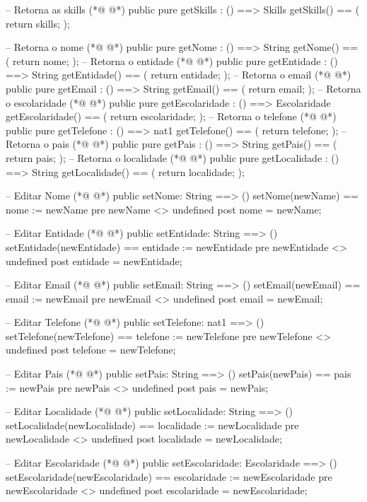 \begin{vdmpp}[breaklines=true]
 -- Retorna as skills
(*@
\label{getSkills:80}
@*)
 public pure getSkills : () ==> Skills
 getSkills() ==
 (
  return skills;
 );
 
 -- Retorna o nome
(*@
\label{getNome:87}
@*)
 public pure getNome : () ==> String
 getNome() ==
 (
  return nome;
 );
 -- Retorna o entidade
(*@
\label{getEntidade:93}
@*)
 public pure getEntidade : () ==> String
 getEntidade() ==
 (
  return entidade;
 );
 -- Retorna o email
(*@
\label{getEmail:99}
@*)
 public pure getEmail : () ==> String
 getEmail() ==
 (
  return email;
 );
 -- Retorna o escolaridade
(*@
\label{getEscolaridade:105}
@*)
 public pure getEscolaridade : () ==> Escolaridade
 getEscolaridade() ==
 (
  return escolaridade;
 );
 -- Retorna o telefone
(*@
\label{getTelefone:111}
@*)
 public pure getTelefone : () ==> nat1
 getTelefone() ==
 (
  return telefone;
 );
 -- Retorna o pais
(*@
\label{getPais:117}
@*)
 public pure getPais : () ==> String
 getPais() ==
 (
  return pais;
 );
 -- Retorna o localidade
(*@
\label{getLocalidade:123}
@*)
 public pure getLocalidade : () ==> String
 getLocalidade() ==
 (
  return localidade;
 );
 
 
 -- Editar Nome
(*@
\label{setNome:131}
@*)
 public setNome: String ==> ()
 setNome(newName) == nome := newName
 pre newName <> undefined
 post nome = newName;
 
 -- Editar Entidade
(*@
\label{setEntidade:137}
@*)
 public setEntidade: String ==> ()
 setEntidade(newEntidade) == entidade := newEntidade
 pre newEntidade <> undefined
 post entidade = newEntidade;
 
 -- Editar Email
(*@
\label{setEmail:143}
@*)
 public setEmail: String ==> ()
 setEmail(newEmail) == email := newEmail
 pre newEmail <> undefined
 post email = newEmail;
 
 -- Editar Telefone
(*@
\label{setTelefone:149}
@*)
 public setTelefone: nat1 ==> ()
 setTelefone(newTelefone) == telefone := newTelefone
 pre newTelefone <> undefined
 post telefone = newTelefone;

 -- Editar Pais
(*@
\label{setPais:155}
@*)
 public setPais: String ==> ()
 setPais(newPais) == pais := newPais
 pre newPais <> undefined
 post pais = newPais;
 
 -- Editar Localidade
(*@
\label{setLocalidade:161}
@*)
 public setLocalidade: String ==> ()
 setLocalidade(newLocalidade) == localidade := newLocalidade
 pre newLocalidade <> undefined
 post localidade = newLocalidade;
 
 -- Editar Escolaridade
(*@
\label{setEscolaridade:167}
@*)
 public setEscolaridade: Escolaridade ==> ()
 setEscolaridade(newEscolaridade) == escolaridade := newEscolaridade
 pre newEscolaridade <> undefined
 post escolaridade = newEscolaridade;
 

\end{vdmpp}
